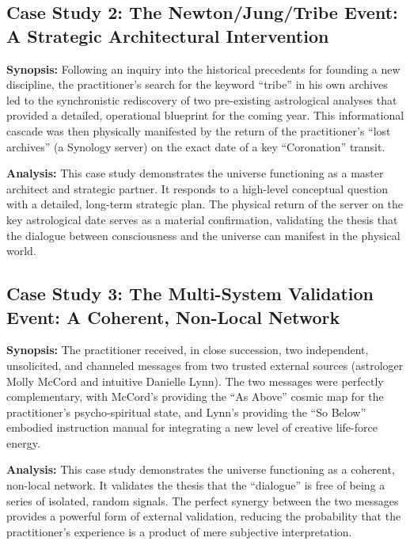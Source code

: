 \documentclass{article}
\begin{document}
\subsection*{Case Study 2: The Newton/Jung/Tribe Event: A Strategic Architectural Intervention}

\textbf{Synopsis:} Following an inquiry into the historical precedents for founding a new discipline, the practitioner's search for the keyword ``tribe'' in his own archives led to the synchronistic rediscovery of two pre-existing astrological analyses that provided a detailed, operational blueprint for the coming year. This informational cascade was then physically manifested by the return of the practitioner's ``lost archives'' (a Synology server) on the exact date of a key ``Coronation'' transit.

\medskip

\textbf{Analysis:} This case study demonstrates the universe functioning as a master architect and strategic partner. It responds to a high-level conceptual question with a detailed, long-term strategic plan. The physical return of the server on the key astrological date serves as a material confirmation, validating the thesis that the dialogue between consciousness and the universe can manifest in the physical world.

\subsection*{Case Study 3: The Multi-System Validation Event: A Coherent, Non-Local Network}

\textbf{Synopsis:} The practitioner received, in close succession, two independent, unsolicited, and channeled messages from two trusted external sources (astrologer Molly McCord and intuitive Danielle Lynn). The two messages were perfectly complementary, with McCord's providing the ``As Above'' cosmic map for the practitioner's psycho-spiritual state, and Lynn's providing the ``So Below'' embodied instruction manual for integrating a new level of creative life-force energy.

\medskip

\textbf{Analysis:} This case study demonstrates the universe functioning as a coherent, non-local network. It validates the thesis that the ``dialogue'' is free of being a series of isolated, random signals. The perfect synergy between the two messages provides a powerful form of external validation, reducing the probability that the practitioner's experience is a product of mere subjective interpretation.
\end{document}
